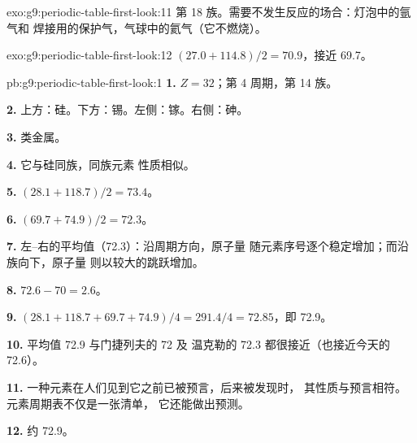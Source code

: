\begin{solution}{exo:g9:periodic-table-first-look:11}
第 18 族。需要不发生反应的场合：灯泡中的氩气和
焊接用的保护气，气球中的氦气（它不燃烧）。
\end{solution}

\begin{solution}{exo:g9:periodic-table-first-look:12}
$(27.0 + 114.8)/2 = 70.9$，接近 69.7。
\end{solution}

\begin{solution}{pb:g9:periodic-table-first-look:1}
\textbf{1.} $Z = 32$；第 4 周期，第 14 族。

\textbf{2.} 上方：硅。下方：锡。左侧：镓。右侧：砷。

\textbf{3.} 类金属。

\textbf{4.} 它与硅同族，同族元素
性质相似。

\textbf{5.} $(28.1 + 118.7)/2 = 73.4$。

\textbf{6.} $(69.7 + 74.9)/2 = 72.3$。

\textbf{7.} 左–右的平均值（72.3）：沿周期方向，原子量
随元素序号逐个稳定增加；而沿族向下，原子量
则以较大的跳跃增加。

\textbf{8.} $72.6 - 70 = 2.6$。

\textbf{9.} $(28.1 + 118.7 + 69.7 + 74.9)/4 = 291.4/4 = 72.85$，即
72.9。

\textbf{10.} 平均值 72.9 与门捷列夫的 72 及
温克勒的 72.3 都很接近（也接近今天的 72.6）。

\textbf{11.} 一种元素在人们见到它之前已被预言，后来被发现时，
其性质与预言相符。元素周期表不仅是一张清单，
它还能做出预测。

\textbf{12.} 约 72.9。
\end{solution}
